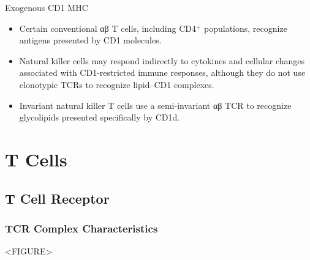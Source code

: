 \begin{core}[label=core:exogenous_cd1mhc]{Exogenous CD1 MHC}
\begin{itemize}
        \item Certain conventional αβ T cells, including CD4$^+$ populations, recognize antigens presented by CD1 molecules.

        \item Natural killer cells may respond indirectly to cytokines and cellular changes associated with CD1-restricted immune responses, although they do not use clonotypic TCRs to recognize lipid--CD1 complexes.

        \item Invariant natural killer T cells use a semi-invariant αβ TCR to recognize glycolipids presented specifically by CD1d.

      \end{itemize}

    \end{core}
 
\section{T Cells}

  \subsection{T Cell Receptor}

    \subsubsection{TCR Complex Characteristics}
    \label{sec:tcr}

      <FIGURE>


